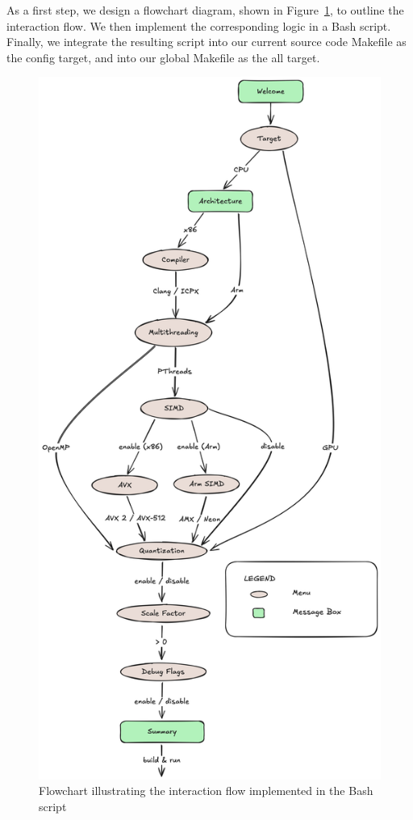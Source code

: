 \documentclass[modern,longauthor]{aastex7}
\begin{document}
As a first step, we design a flowchart diagram, shown in Figure~\ref{fig:goose}, to outline the interaction flow. We then implement the corresponding logic in a Bash script. Finally, we integrate the resulting script into our current source code Makefile as the config target, and into our global Makefile as the all target.
\begin{figure}[htb!]
    \centering
    \includegraphics[width=0.4\linewidth]{Dialog/Goose.png}
    \caption{Flowchart illustrating the interaction flow implemented in the Bash script}
   \label{fig:goose}
\end{figure}
\end{document}
